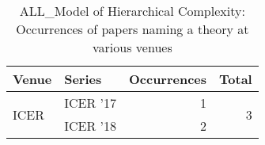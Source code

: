 \begin{table*}[t]
\begin{tabular}{llrr}
Venue & Series & Occurrences & Total\\\hline
\multirow{2}{*}{ICER } & ICER '17 & 1 & \multirow{2}{*}{3}\\
& ICER '18 & 2 &\\
\end{tabular}
\caption{ALL\_Model of Hierarchical Complexity: Occurrences of papers naming a theory at various venues}
\end{table*}